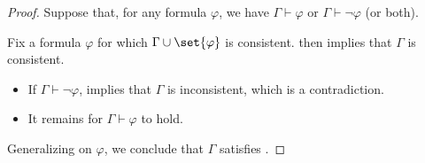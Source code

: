 \begin{proof}
  \NecessitySubProof Suppose that, for any formula \( \varphi \), we have \( \Gamma \vdash \varphi \) or \( \Gamma \vdash \neg \varphi \) (or both).

  Fix a formula \( \varphi \) for which \( \Gamma \cup \set{ \varphi } \) is consistent.  then implies that \( \Gamma \) is consistent.

  \begin{itemize}
    \item If \( \Gamma \vdash \neg \varphi \),  implies that \( \Gamma \) is inconsistent, which is a contradiction.
    \item It remains for \( \Gamma \vdash \varphi \) to hold.
  \end{itemize}

  Generalizing on \( \varphi \), we conclude that \( \Gamma \) satisfies .
\end{proof}

